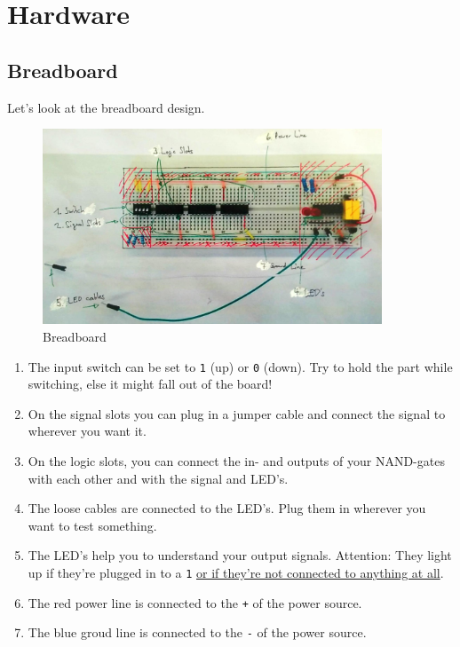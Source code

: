 \documentclass[10pt,a4paper]{article}
\begin{document}
\newpage

\section{Hardware}

\subsection{Breadboard}
Let's look at the breadboard design.
    \begin{figure}[H]
      \centering
      \includegraphics[width=0.9\textwidth]{breadboard_labeled}%
      \caption{Breadboard}%
      \label{fig:breadboard_labelled}
    \end{figure}

\begin{enumerate}
 \item The input switch can be set to \texttt{1} (up) or \texttt{0} (down). Try to hold the part while switching, else it might fall out of the board!
 \item On the signal slots you can plug in a jumper cable and connect the signal to wherever you want it.
 \item On the logic slots, you can connect the in- and outputs of your NAND-gates with each other and with the signal and LED's. 
 \item The loose cables are connected to the LED's. Plug them in wherever you want to test something.
 \item The LED's help you to understand your output signals. Attention: They light up if they're plugged in to a \texttt{1} \underline{or if they're not connected to anything at all}. 
 \item The red power line is connected to the \texttt{+} of the power source.
 \item The blue groud line is connected to the \texttt{-} of the power source. 
\end{enumerate}
\end{document}
